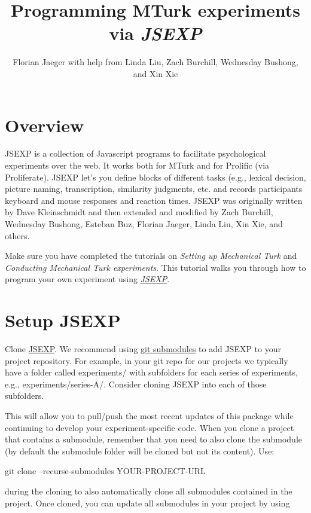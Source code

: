 \documentclass{article}
\title{Programming MTurk experiments via {\em JSEXP}}
\author{Florian Jaeger with help from Linda Liu, Zach Burchill, Wednesday Bushong, and Xin Xie}
\newenvironment{code}%
   {\par\noindent\adjustbox{margin=1ex,bgcolor=shadecolor,margin=0ex \medskipamount}\bgroup\minipage\linewidth\codewrap}%
   {\endcodewrap\endminipage\egroup}
\begin{document}
\maketitle

\tableofcontents 

\section{Overview}

JSEXP is a collection of Javascript programs to facilitate psychological experiments over the web. It works both for MTurk and for Prolific (via Proliferate). JSEXP let's you define blocks of different tasks (e.g., lexical decision, picture naming, transcription, similarity judgments, etc. and records participants keyboard and mouse responses and reaction times. JSEXP was originally written by Dave Kleinschmidt and then extended and modified by Zach Burchill, Wednesday Bushong, Esteban Buz, Florian Jaeger, Linda Liu, Xin Xie, and others. 

Make sure you have completed the tutorials on {\em Setting up Mechanical Turk} and {\em Conducting Mechanical Turk experiments}. This tutorial walks you through how to program your own experiment using {\em \href{https://github.com/hlplab/JSEXP/}{JSEXP}}.

\section{Setup JSEXP}
Clone \href{https://github.com/hlplab/JSEXP}{JSEXP}. We recommend using \href{https://git-scm.com/book/en/v2/Git-Tools-Submodules}{git submodules} to add JSEXP to your project repository. For example, in your git repo for our projects we typically have a folder called experiments/ with subfolders for each series of experiments, e.g., experiments/series-A/. Consider cloning JSEXP into each of those subfolders.

This will allow you to pull/push the most recent updates of this package while continuing to develop your experiment-specific code. When you clone a
project that contains a submodule, remember that you need to also clone the submodule (by default the submodule folder will be cloned but
not its content). Use:

\begin{code}
git clone --recurse-submodules YOUR-PROJECT-URL
\end{code}

during the cloning to also automatically clone all submodules contained in the project. Once cloned, you can update all submodules in your project by using 
\end{document}

